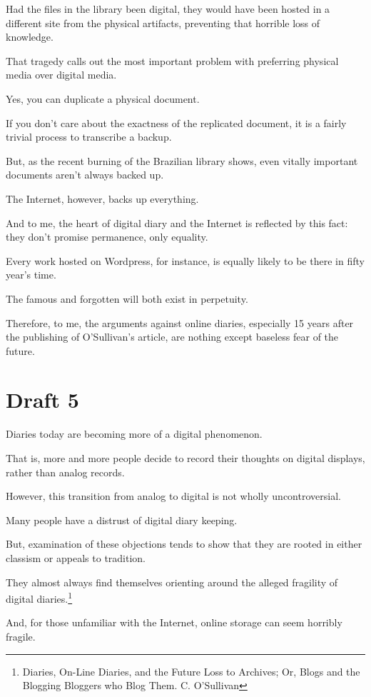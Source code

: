 \documentclass[12pt]{article}[titlepage]
\newcommand{\1}{\={a}}
\newcommand{\2}{\={e}}
\newcommand{\3}{\={\i}}
\newcommand{\4}{\=o}
\newcommand{\5}{\=u}
\newcommand{\6}{\={A}}
\renewcommand{\,}{\textsuperscript{,}}
\begin{document}
Had the files in the library been digital, they would have been hosted in a different site from the physical artifacts, preventing that horrible loss of knowledge.


That tragedy calls out the most important problem with preferring physical media over digital media.

Yes, you can duplicate a physical document.

If you don’t care about the exactness of the replicated document, it is a fairly trivial process to transcribe a backup.

But, as the recent burning of the Brazilian library shows, even vitally important documents aren’t always backed up.

The Internet, however, backs up everything.


And to me, the heart of digital diary and the Internet is reflected by this fact: they don’t promise permanence, only equality.

Every work hosted on Wordpress, for instance, is equally likely to be there in fifty year’s time.

The famous and forgotten will both exist in perpetuity.

Therefore, to me, the arguments against online diaries, especially 15 years after the publishing of O’Sullivan’s article, are nothing except baseless fear of the future.


\section{Draft 5}

Diaries today are becoming more of a digital phenomenon.

That is, more and more people decide to record their thoughts on digital displays, rather than analog records.

However, this transition from analog to digital is not wholly uncontroversial.


Many people have a distrust of digital diary keeping.

But, examination of these objections tends to show that they are rooted in either classism or appeals to tradition.

They almost always find themselves orienting around the alleged fragility of digital diaries.\footnote{Diaries, On-Line Diaries, and the Future Loss to Archives; Or, Blogs and the Blogging Bloggers who Blog Them. C. O’Sullivan}


And, for those unfamiliar with the Internet, online storage can seem horribly fragile.
\end{document}
